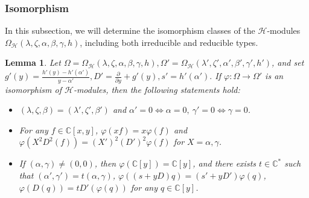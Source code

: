 \documentclass[12pt,reqno]{amsart}
\def\C{\mathbb{C}}
\numberwithin{equation}{section}
\newtheorem{lemm}[theo]{Lemma}
\begin{document}
\subsubsection{Isomorphism}
In this subsection, we will determine the isomorphism classes of the $\mathcal{H}$-modules
$\Omega_{\mathcal{H}}(\lambda,\zeta,\alpha,\beta,\gamma,h)$, including both irreducible and reducible types. 

\begin{lemm}\label{preth10}
    Let $\Omega=\Omega_{\mathcal{H}}(\lambda,\zeta,\alpha,\beta,\gamma,h),
\Omega'=\Omega_{\mathcal{H}}(\lambda',\zeta',\alpha',\beta',\gamma',h')$,
and set $g'(y)=\frac{h'(y)-h'(\alpha')}{y- \alpha'},  D'=\frac{\partial}{\partial{y}}+g'(y), s'=h'(\alpha'). $ If $\varphi:\Omega\longrightarrow\Omega'$ is an isomorphism of $\mathcal{H}$-modules, then the following statements hold:
\begin{itemize}
\item[{\rm (1)}] $(\lambda,\zeta,\beta)=(\lambda',\zeta',\beta')$ and $\alpha'=0\iff \alpha=0,\ \gamma'=0\iff\gamma=0$.
\item[{\rm (2)}]For any $f\in\C[x,y]$, $\varphi(xf)=x\varphi(f)$ and $\varphi(X^2D^2(f))=(X')^2(D')^2\varphi(f)$ for $X=\alpha,\gamma$.
\item[{\rm (3)}]If $(\alpha,\gamma)\neq(0,0)$, then $\varphi(\C[y])=\C[y]$, and there exists $t\in\C^*$ such that $(\alpha',\gamma')=t(\alpha,\gamma)$, $\varphi((s+yD)q)=(s'+yD')\varphi(q)$, $\varphi(D(q))=tD'(\varphi(q))$ for any $q\in\C[y]$.
\end{itemize}
\end{lemm}
\end{document}
